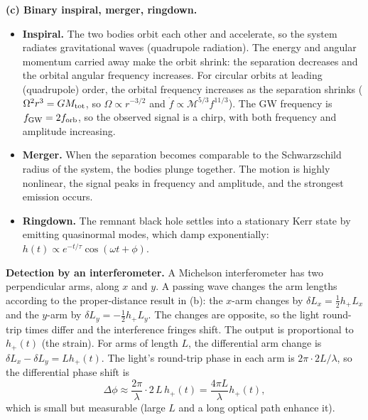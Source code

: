 \documentclass[12pt]{article}
\newcommand{\be}{\begin{equation}}
\newcommand{\ee}{\end{equation}}
\begin{document}
\textbf{(c) Binary inspiral, merger, ringdown.}
\begin{itemize}
\item \textbf{Inspiral.} The two bodies orbit each other and accelerate, so the system radiates gravitational waves (quadrupole radiation). The energy and angular momentum carried away make the orbit shrink: the separation decreases and the orbital angular frequency increases. For circular orbits at leading (quadrupole) order, the orbital frequency increases as the separation shrinks ($\Omega^2 r^3 = G M_{\rm tot}$, so $\Omega\propto r^{-3/2}$ and $\dot f\propto \mathcal{M}^{5/3}f^{11/3}$). The GW frequency is $f_{\rm GW}=2f_{\rm orb}$, so the observed signal is a chirp, with both frequency and amplitude increasing.
\item \textbf{Merger.} When the separation becomes comparable to the Schwarzschild radius of the system, the bodies plunge together. The motion is highly nonlinear, the signal peaks in frequency and amplitude, and the strongest emission occurs.
\item \textbf{Ringdown.} The remnant black hole settles into a stationary Kerr state by emitting quasinormal modes, which damp exponentially: $h(t)\propto e^{-t/\tau}\cos(\omega t+\phi)$.
\end{itemize}
\textbf{Detection by an interferometer.} A Michelson interferometer has two perpendicular arms, along $x$ and $y$. A passing wave changes the arm lengths according to the proper-distance result in (b): the $x$-arm changes by $\delta L_x = \tfrac12 h_+ L_x$ and the $y$-arm by $\delta L_y = -\tfrac12 h_+ L_y$. The changes are opposite, so the light round-trip times differ and the interference fringes shift. The output is proportional to $h_+(t)$ (the strain). For arms of length $L$, the differential arm change is $\delta L_{x}-\delta L_{y} = L h_+(t)$. The light's round-trip phase in each arm is $2\pi\cdot 2L/\lambda$, so the differential phase shift is
\be
\Delta\phi \approx \frac{2\pi}{\lambda}\cdot 2\,L\,h_+(t) = \frac{4\pi L}{\lambda}h_+(t),
\ee
which is small but measurable (large $L$ and a long optical path enhance it).
\end{document}
